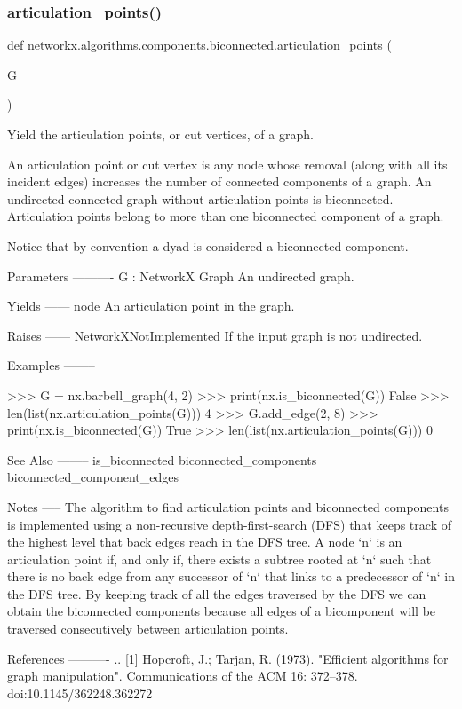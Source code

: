 \subsubsection{\texorpdfstring{articulation\+\_\+points()}{articulation\_points()}}
{\footnotesize\ttfamily def networkx.\+algorithms.\+components.\+biconnected.\+articulation\+\_\+points (\begin{DoxyParamCaption}\item[{}]{G }\end{DoxyParamCaption})}

\begin{DoxyVerb}Yield the articulation points, or cut vertices, of a graph.

An articulation point or cut vertex is any node whose removal (along with
all its incident edges) increases the number of connected components of
a graph.  An undirected connected graph without articulation points is
biconnected. Articulation points belong to more than one biconnected
component of a graph.

Notice that by convention a dyad is considered a biconnected component.

Parameters
----------
G : NetworkX Graph
    An undirected graph.

Yields
------
node
    An articulation point in the graph.

Raises
------
NetworkXNotImplemented
    If the input graph is not undirected.

Examples
--------

>>> G = nx.barbell_graph(4, 2)
>>> print(nx.is_biconnected(G))
False
>>> len(list(nx.articulation_points(G)))
4
>>> G.add_edge(2, 8)
>>> print(nx.is_biconnected(G))
True
>>> len(list(nx.articulation_points(G)))
0

See Also
--------
is_biconnected
biconnected_components
biconnected_component_edges

Notes
-----
The algorithm to find articulation points and biconnected
components is implemented using a non-recursive depth-first-search
(DFS) that keeps track of the highest level that back edges reach
in the DFS tree.  A node `n` is an articulation point if, and only
if, there exists a subtree rooted at `n` such that there is no
back edge from any successor of `n` that links to a predecessor of
`n` in the DFS tree.  By keeping track of all the edges traversed
by the DFS we can obtain the biconnected components because all
edges of a bicomponent will be traversed consecutively between
articulation points.

References
----------
.. [1] Hopcroft, J.; Tarjan, R. (1973).
       "Efficient algorithms for graph manipulation".
       Communications of the ACM 16: 372–378. doi:10.1145/362248.362272\end{DoxyVerb}
